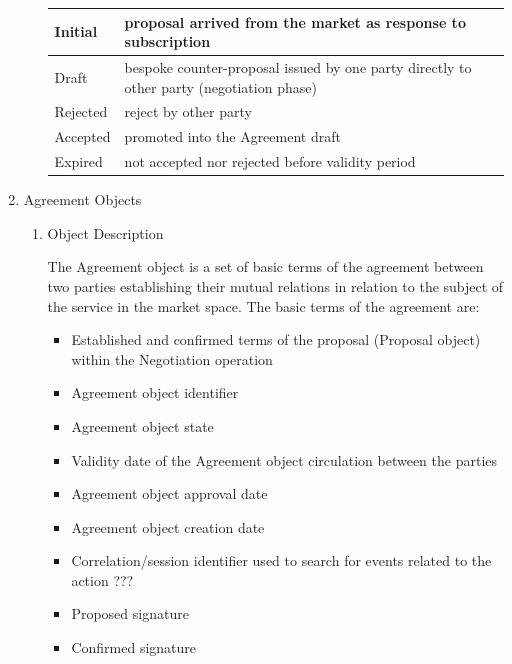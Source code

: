 \begin{enumerate}
\begin{enumerate}
\begin{center}
\begin{tabular}{|p{3cm}|p{11cm}|}
Initial 	&	proposal arrived from the market as response to subscription \\
\hline
Draft 		&	bespoke counter-proposal issued by one party directly to other party (negotiation phase) \\
\hline
Rejected 	&	reject by other party \\
\hline
Accepted 	&	promoted into the Agreement draft \\
\hline
Expired 	&	not accepted nor rejected before validity period \\
\hline

\end{tabular}
\end{center}

\end{enumerate}

\item Agreement Objects

\begin{enumerate}

\item Object Description

The Agreement object is a set of basic terms of the agreement between two parties establishing their mutual relations
in relation to the subject of the service in the market space.
The basic terms of the agreement are:

\begin{itemize}

\item Established and confirmed terms of the proposal (Proposal object) within the Negotiation operation

\item Agreement object identifier

\item Agreement object state

\item Validity date of the Agreement object circulation between the parties

\item Agreement object approval date

\item Agreement object creation date

\item Correlation/session identifier used to search for events related to the action ???

\item Proposed signature

\item Confirmed signature


\end{itemize}
\end{enumerate}
\end{enumerate}
